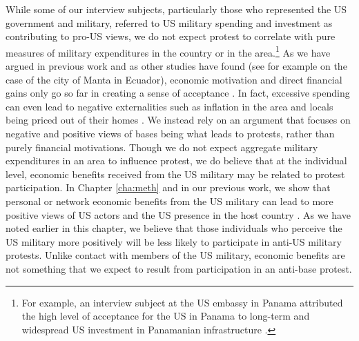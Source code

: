  





While some of our interview subjects, particularly those who represented the US government and military, referred to US military spending and investment as contributing to pro-US views, we do not expect protest to correlate with pure measures of military expenditures in the country or in the area.\footnote{For example, an interview subject at the US embassy in Panama attributed the high level of acceptance for the US in Panama to long-term and widespread US investment in Panamanian infrastructure \cite{embthree20180712}.}  As we have argued in previous work and as other studies have found (see for example  on the case of the city of Manta in Ecuador), economic motivation and direct financial gains only go so far in creating a sense of acceptance \cite{Allen2020}.  In fact, excessive spending can even lead to negative externalities such as inflation in the area and locals being priced out of their homes \cite{Hohn2010,Fitz2015}.  We instead rely on an argument that focuses on negative and positive views of bases being what leads to protests, rather than purely financial motivations.
Though we do not expect aggregate military expenditures in an area to influence protest, we do believe that at the individual level, economic benefits received from the US military may be related to protest participation. In Chapter \ref{cha:meth} and in our previous work, we show that personal or network economic benefits from the US military can lead to more positive views of US actors and the US presence in the host country \cite{Allen2020}. As we have noted earlier in this chapter, we believe that those individuals who perceive the US military more positively will be less likely to participate in anti-US military protests. Unlike contact with members of the US military, economic benefits are not something that we expect to result from participation in an anti-base protest. 

